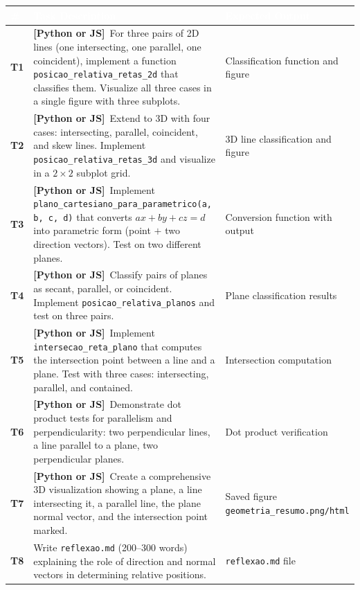 \documentclass[a4paper,11pt]{article}
\newcommand{\bothlabel}{\textcolor{ippblue}{\textbf{[Python or JS]}}}
\begin{document}
\renewcommand{\arraystretch}{1.3}
\begin{tabularx}{\textwidth}{
  >{\centering\bfseries\cellcolor{lightblue}}p{0.8cm}
  X
  p{3.5cm}
}
\toprule
\rowcolor{ippblue}
\textcolor{white}{\#} & \textcolor{white}{\textbf{Task Description}} & \textcolor{white}{\textbf{Expected Output}} \\
\midrule
T1 & \bothlabel\ For three pairs of 2D lines (one intersecting, one parallel, one coincident), implement a function \texttt{posicao\_relativa\_retas\_2d} that classifies them. Visualize all three cases in a single figure with three subplots. & Classification function and figure \\
\rowcolor{lightgray}
T2 & \bothlabel\ Extend to 3D with four cases: intersecting, parallel, coincident, and skew lines. Implement \texttt{posicao\_relativa\_retas\_3d} and visualize in a $2 \times 2$ subplot grid. & 3D line classification and figure \\
T3 & \bothlabel\ Implement \texttt{plano\_cartesiano\_para\_parametrico(a, b, c, d)} that converts $ax + by + cz = d$ into parametric form (point $+$ two direction vectors). Test on two different planes. & Conversion function with output \\
\rowcolor{lightgray}
T4 & \bothlabel\ Classify pairs of planes as secant, parallel, or coincident. Implement \texttt{posicao\_relativa\_planos} and test on three pairs. & Plane classification results \\
T5 & \bothlabel\ Implement \texttt{intersecao\_reta\_plano} that computes the intersection point between a line and a plane. Test with three cases: intersecting, parallel, and contained. & Intersection computation \\
\rowcolor{lightgray}
T6 & \bothlabel\ Demonstrate dot product tests for parallelism and perpendicularity: two perpendicular lines, a line parallel to a plane, two perpendicular planes. & Dot product verification \\
T7 & \bothlabel\ Create a comprehensive 3D visualization showing a plane, a line intersecting it, a parallel line, the plane normal vector, and the intersection point marked. & Saved figure \texttt{geometria\_resumo.png/html} \\
\rowcolor{lightgray}
T8 & Write \texttt{reflexao.md} (200--300 words) explaining the role of direction and normal vectors in determining relative positions. & \texttt{reflexao.md} file \\
\bottomrule
\end{tabularx}
\end{document}
